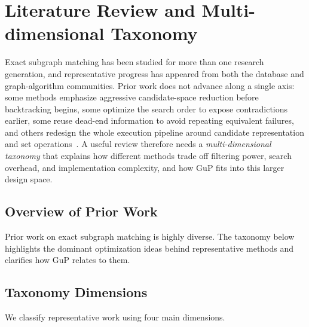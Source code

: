 \section{Literature Review and Multi-dimensional Taxonomy}
\label{sec:lit-review}

Exact subgraph matching has been studied for more than one research generation, and representative progress has appeared from both the database and graph-algorithm communities. Prior work does not advance along a single axis: some methods emphasize aggressive candidate-space reduction before backtracking begins, some optimize the search order to expose contradictions earlier, some reuse dead-end information to avoid repeating equivalent failures, and others redesign the whole execution pipeline around candidate representation and set operations~\cite{he2008graphql,han2019daf,sun2020study,sun2021rapidmatch,kim2022veq,arai2023gup}. A useful review therefore needs a \emph{multi-dimensional taxonomy} that explains how different methods trade off filtering power, search overhead, and implementation complexity, and how GuP fits into this larger design space.

\subsection{Overview of Prior Work}

Prior work on exact subgraph matching is highly diverse. The taxonomy below highlights the dominant optimization ideas behind representative methods and clarifies how GuP relates to them.

\subsection{Taxonomy Dimensions}

We classify representative work using four main dimensions.

